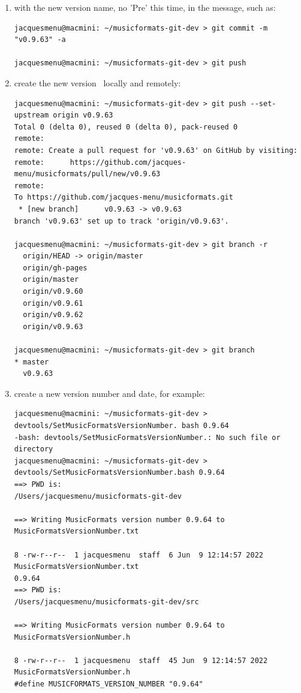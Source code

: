 \begin{enumerate}
\item {} with the new version name, no 'Pre' this time, in the  message, such as:
\begin{lstlisting}[language=Terminal]
jacquesmenu@macmini: ~/musicformats-git-dev > git commit -m "v0.9.63" -a

jacquesmenu@macmini: ~/musicformats-git-dev > git push
\end{lstlisting}


\item create the new version \branch\ locally and remotely:
\begin{lstlisting}[language=Terminal]
jacquesmenu@macmini: ~/musicformats-git-dev > git push --set-upstream origin v0.9.63
Total 0 (delta 0), reused 0 (delta 0), pack-reused 0
remote:
remote: Create a pull request for 'v0.9.63' on GitHub by visiting:
remote:      https://github.com/jacques-menu/musicformats/pull/new/v0.9.63
remote:
To https://github.com/jacques-menu/musicformats.git
 * [new branch]      v0.9.63 -> v0.9.63
branch 'v0.9.63' set up to track 'origin/v0.9.63'.

jacquesmenu@macmini: ~/musicformats-git-dev > git branch -r
  origin/HEAD -> origin/master
  origin/gh-pages
  origin/master
  origin/v0.9.60
  origin/v0.9.61
  origin/v0.9.62
  origin/v0.9.63

jacquesmenu@macmini: ~/musicformats-git-dev > git branch
* master
  v0.9.63
\end{lstlisting}


\item create a new version number and date, for example:
\begin{lstlisting}[language=TerminalSmall]
jacquesmenu@macmini: ~/musicformats-git-dev > devtools/SetMusicFormatsVersionNumber. bash 0.9.64
-bash: devtools/SetMusicFormatsVersionNumber.: No such file or directory
jacquesmenu@macmini: ~/musicformats-git-dev > devtools/SetMusicFormatsVersionNumber.bash 0.9.64
==> PWD is:
/Users/jacquesmenu/musicformats-git-dev

==> Writing MusicFormats version number 0.9.64 to MusicFormatsVersionNumber.txt

8 -rw-r--r--  1 jacquesmenu  staff  6 Jun  9 12:14:57 2022 MusicFormatsVersionNumber.txt
0.9.64
==> PWD is:
/Users/jacquesmenu/musicformats-git-dev/src

==> Writing MusicFormats version number 0.9.64 to MusicFormatsVersionNumber.h

8 -rw-r--r--  1 jacquesmenu  staff  45 Jun  9 12:14:57 2022 MusicFormatsVersionNumber.h
#define MUSICFORMATS_VERSION_NUMBER "0.9.64"
\end{lstlisting}


\end{enumerate}

